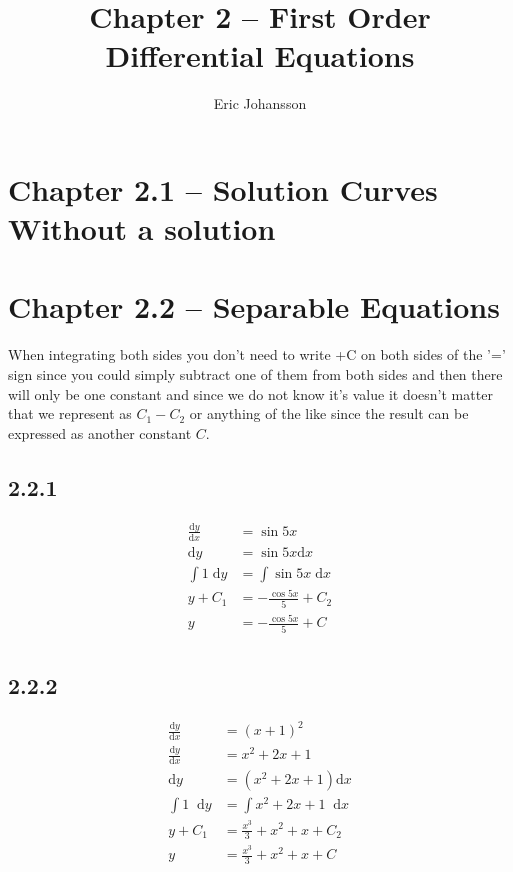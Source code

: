 \documentclass{article}
\title{Chapter 2 -- First Order Differential Equations}
\author{Eric Johansson}
\newcommand*\dif{\mathop{}\!\mathrm{d}}
\begin{document}
\maketitle
\tableofcontents
\newpage
\section{Chapter 2.1 -- Solution Curves Without a solution} 
\subsection{}

\section{Chapter 2.2 -- Separable Equations} 
When integrating both sides you don't need to write +C on both sides of the '=' sign since
you could simply subtract one of them from both sides and then 
there will only be one constant and since we do not know it's
value it doesn't matter that we represent as \( C_1-C_2 \)
or anything of the like since the result can be expressed
as another constant \( C \).

\subsection{2.2.1}
    \begin{align*}
        \frac{\mathrm{d}y}{\mathrm{d}x} &= \sin 5x \\
        \mathrm{d}y &= \sin 5x \mathrm{d}x \\
        \int 1 \; \mathrm{d}y  &= \int \sin 5x \; \mathrm{d}x \\
        y+C_1  &= -\frac{ \cos 5x}{5} + C_2 \\
        y &= -\frac{\cos 5x}{5}+C \\
    \end{align*}

\subsection{2.2.2}
\begin{align*}
    \frac{\mathrm{d}y}{\mathrm{d}x} &= \left(x+1\right)^2 \\
    \frac{\mathrm{d}y}{\mathrm{d}x} &= x^2+2x+1 \\
    \mathrm{d}y &= (x^2+2x+1) \mathrm{d}x \\
    \int 1 \dif y  &= \int x^2+2x+1 \dif x \\
    y+C_1  &=  \frac{x^3}{3}+x^2+x+C_2 \\
    y &= \frac{x^3}{3}+x^2+x+C
\end{align*}
\end{document}
